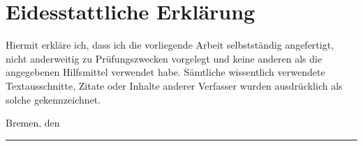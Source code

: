 \chapter*{Eidesstattliche Erkl\"arung}



Hiermit erkl\"are ich, dass ich die vorliegende Arbeit selbstst\"andig angefertigt,
nicht anderweitig zu Pr\"ufungszwecken vorgelegt und keine anderen als die
angegebenen Hilfsmittel verwendet habe. S\"amtliche wissentlich verwendete
Textausschnitte, Zitate oder Inhalte anderer Verfasser wurden ausdr\"ucklich als
solche gekennzeichnet.

Bremen, den \makeatletter\@date\makeatother

\vspace*{1em}
\rule{15em}{0.16667pt}\\
\myauthor
\makeatletter\@author\makeatother